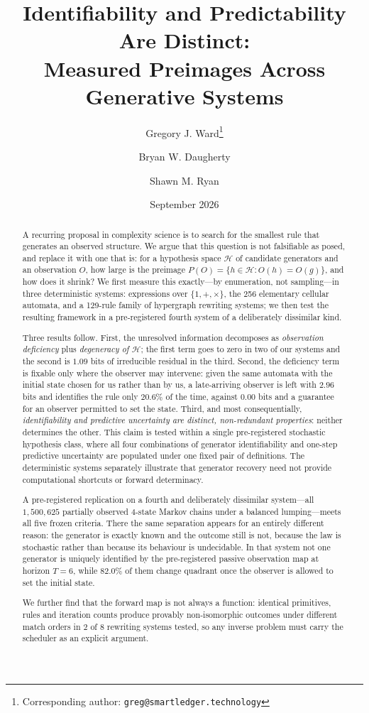 \documentclass[11pt]{article}
\title{\bf Identifiability and Predictability Are Distinct:\\
Measured Preimages Across Generative Systems}
\author{
  Gregory J. Ward\thanks{Corresponding author: \texttt{greg@smartledger.technology}}
  \and Bryan W. Daugherty
  \and Shawn M. Ryan
}
\date{September 2026}
\newcommand{\HH}{\ensuremath{\mathcal{H}}}
\begin{document}
\maketitle

\begin{abstract}
A recurring proposal in complexity science is to search for the smallest rule that
generates an observed structure. We argue that this question is not falsifiable as
posed, and replace it with one that is: for a hypothesis space $\HH$ of candidate
generators and an observation $O$, how large is the preimage
$P(O)=\{h\in\HH : O(h)=O(g)\}$, and how does it shrink?
We first measure this exactly---by enumeration, not sampling---in three deterministic
systems: expressions over $\{1,+,\times\}$, the 256 elementary cellular automata, and a
129-rule family of hypergraph rewriting systems; we then test the resulting framework in
a pre-registered fourth system of a deliberately dissimilar kind.

Three results follow. First, the unresolved information decomposes as
\emph{observation deficiency} plus \emph{degeneracy of $\HH$}; the first term goes to
zero in two of our systems and the second is $1.09$ bits of irreducible residual in
the third. Second, the deficiency term is fixable only where the observer may
intervene: given the same automata with the initial state chosen for us rather than
by us, a late-arriving observer is left with $2.96$ bits and identifies the rule only
$20.6\%$ of the time, against $0.00$ bits and a guarantee for an observer permitted to
set the state. Third, and most consequentially, \emph{identifiability and predictive uncertainty are
distinct, non-redundant properties}: neither determines the other. This claim is tested
within a single pre-registered stochastic hypothesis class, where all four combinations of
generator identifiability and one-step predictive uncertainty are populated under one
fixed pair of definitions. The deterministic systems separately illustrate that generator
recovery need not provide computational shortcuts or forward determinacy.

A pre-registered replication on a fourth and deliberately dissimilar system---all
$1{,}500{,}625$ partially observed $4$-state Markov chains under a balanced lumping---meets
all five frozen criteria. There the same separation appears for an entirely different
reason: the generator is exactly known and the outcome still is not, because the law is
stochastic rather than because its behaviour is undecidable. In that system not one generator
is uniquely identified by the pre-registered passive observation map at horizon $T=6$,
while $82.0\%$ of them change quadrant once the observer is allowed to set the initial
state.

We further find that the forward map is not always a function: identical primitives,
rules and iteration counts produce provably non-isomorphic outcomes under different
match orders in $2$ of $8$ rewriting systems tested, so any inverse problem must
carry the scheduler as an explicit argument.
\end{abstract}
\end{document}
